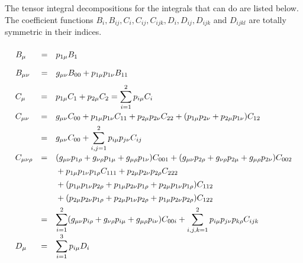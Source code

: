 The tensor integral decompositions for the integrals that \fc can
do are listed below. The coefficient functions $B_i, B_{ij},
C_i, C_{ij}, C_{ijk}, D_i, D_{ij}, D_{ijk}$ and $D_{ijkl}$ 
are totally symmetric in their indices.

\[
\begin{array}{lll}
\hphantom{C_{\mu \nu \rho }} &&
\hphantom{\mbox{}(g_{\mu \nu }p_{1\rho }+g_{\nu \rho }p_{1\mu }+
g_{\mu \rho }p_{1\nu }) C_{001} + (g_{\mu \nu }p_{2\rho }+g_{\nu \rho }
p_{2\mu }+ g_{\mu \rho }p_{2\nu }) C_{002}}\\[-.7em]
B_{\mu } & = & p_{1\mu } B_{1} \\[1em]
B_{\mu \nu } & = & g_{\mu \nu } B_{00} + p_{1\mu } p_{1\nu } B_{11}
\end{array}
\]
\[
\begin{array}{lll}
C_{\mu } & = & p_{1\mu } C_{1} + p_{2\mu } C_{2}
= \displaystyle\sum_{i=1}^{2} p_{i\mu} C_{i} \\[1.2em]
C_{\mu \nu } & = & g_{\mu \nu }C_{00} + p_{1\mu }p_{1\nu }C_{11} + p_{2\mu}
p_{2\nu }C_{22} +(p_{1\mu }p_{2\nu }+p_{2\mu }p_{1\nu }) C_{12} \\[1ex]
&=& g_{\mu \nu }C_{00} +
\displaystyle\sum_{i,j=1}^{2} p_{i\mu} p_{j\nu }C_{ij} \\[1.2em]
C_{\mu \nu \rho } &=& \mbox{}(g_{\mu \nu }p_{1\rho }+g_{\nu \rho }p_{1\mu }+
g_{\mu \rho }p_{1\nu }) C_{001} + (g_{\mu \nu }p_{2\rho }+g_{\nu \rho }
p_{2\mu }+ g_{\mu \rho }p_{2\nu }) C_{002}  \\[1ex]
&&\mbox{} + p_{1\mu }p_{1\nu }p_{1\rho } C_{111}
+ p_{2\mu }p_{2\nu }p_{2\rho } C_{222} \\[1ex]
&&\mbox{} +(p_{1\mu }p_{1\nu }p_{2\rho }+
p_{1\mu }p_{2\nu }p_{1\rho }+
p_{2\mu }p_{1\nu }p_{1\rho }  ) C_{112} \\[1ex]
&&\mbox{} +(p_{2\mu }p_{2\nu }p_{1\rho } + p_{2\mu }p_{1\nu }p_{2\rho }+
p_{1\mu }p_{2\nu }p_{2\rho } ) C_{122} \\[1ex]
&=& \displaystyle\sum_{i=1}^{2}(g_{\mu \nu }p_{i\rho }+g_{\nu \rho }p_{i\mu }
+ g_{\mu \rho }p_{i\nu }) C_{00i}
+ \displaystyle \sum_{i,j,k=1}^{2} p_{i\mu} p_{j\nu }p_{k\rho}C_{ijk} \\[1ex]
D_{\mu } &=& \displaystyle\sum_{i=1}^{3} p_{i\mu} D_{i} \\[1em]

\end{array}\]
